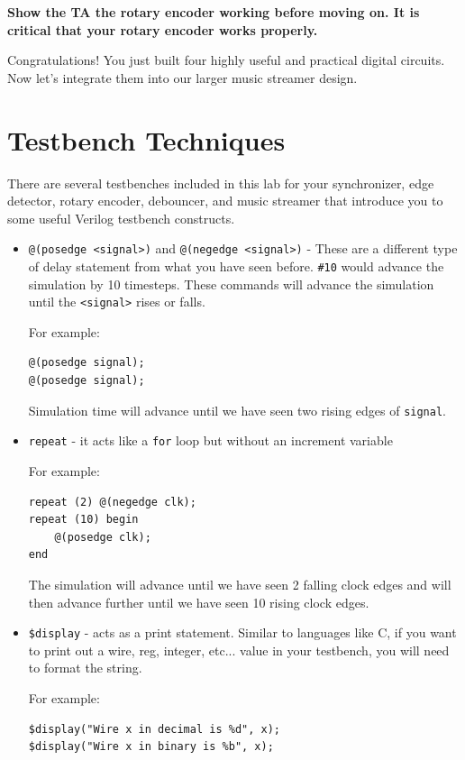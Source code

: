 \documentclass[11pt]{article}
\begin{document}
\textbf{Show the TA the rotary encoder working before moving on. It is critical that your rotary encoder works properly.}

Congratulations! You just built four highly useful and practical digital circuits. Now let's integrate them into our larger music streamer design.

\section{Testbench Techniques}
There are several testbenches included in this lab for your synchronizer, edge detector, rotary encoder, debouncer, and music streamer that introduce you to some useful Verilog testbench constructs.

\begin{itemize}
\item \verb|@(posedge <signal>)| and \verb|@(negedge <signal>)| - These are a different type of delay statement from what you have seen before. \verb|#10| would advance the simulation by 10 timesteps. These commands will advance the simulation until the \verb|<signal>| rises or falls.

For example:
\begin{verbatim}
@(posedge signal);
@(posedge signal);
\end{verbatim}

Simulation time will advance until we have seen two rising edges of \verb|signal|.

\item \verb|repeat| - it acts like a \verb|for| loop but without an increment variable

For example:
\begin{verbatim}
repeat (2) @(negedge clk);
repeat (10) begin 
	@(posedge clk);
end
\end{verbatim} 

The simulation will advance until we have seen 2 falling clock edges and will then advance further until we have seen 10 rising clock edges.

\item \verb|$display| - acts as a print statement. Similar to languages like C, if you want to print out a wire, reg, integer, etc... value in your testbench, you will need to format the string.

For example:
\begin{verbatim}
$display("Wire x in decimal is %d", x);
$display("Wire x in binary is %b", x);
\end{verbatim} 


\end{itemize}
\end{document}
